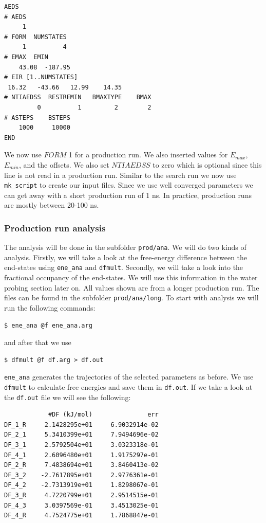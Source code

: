 \begin{lstlisting}
AEDS
# AEDS
     1
# FORM  NUMSTATES
     1          4
# EMAX  EMIN
    43.08  -187.95
# EIR [1..NUMSTATES]
 16.32   -43.66   12.99    14.35 
# NTIAEDSS  RESTREMIN   BMAXTYPE    BMAX   
         0          1         2        2      
# ASTEPS    BSTEPS
    1000     10000 
END
\end{lstlisting}

We now use $FORM$ 1 for a production run. We also inserted values for $E_{max}$, $E_{min}$, and the offsets. We also set $NTIAEDSS$ to zero which is optional since this line is not read in a production run. Similar to the search run we now use \texttt{mk\_script} to create our input files.
Since we use well converged parameters we can get away with a short production run of 1 ns. In practice, production runs are mostly between 20-100 ns.

\subsubsection{Production run analysis}
The analysis will be done in the subfolder \texttt{prod/ana}. We will do two kinds of analysis. Firstly, we will take a look at the free-energy difference between the end-states using \texttt{ene\_ana} and \texttt{dfmult}. Secondly, we will take a look into the fractional occupancy of the end-states. We will use this information in the water probing section later on. All values shown are from a longer production run. The files can be found in the subfolder \texttt{prod/ana/long}. To start with analysis we will run the following commands:

\begin{lstlisting}
$ ene_ana @f ene_ana.arg
\end{lstlisting}

and after that we use

\begin{lstlisting}
$ dfmult @f df.arg > df.out
\end{lstlisting}

\texttt{ene\_ana} generates the trajectories of the selected parameters as before. We use \texttt{dfmult} to calculate free energies and save them in \texttt{df.out}. If we take a look at the \texttt{df.out} file we will see the following:

\begin{lstlisting}
            #DF (kJ/mol)               err
DF_1_R     2.1428295e+01     6.9032914e-02
DF_2_1     5.3410399e+01     7.9494696e-02
DF_3_1     2.5792504e+01     3.0323318e-01
DF_4_1     2.6096480e+01     1.9175297e-01
DF_2_R     7.4838694e+01     3.8460413e-02
DF_3_2    -2.7617895e+01     2.9776361e-01
DF_4_2    -2.7313919e+01     1.8298067e-01
DF_3_R     4.7220799e+01     2.9514515e-01
DF_4_3     3.0397569e-01     3.4513025e-01
DF_4_R     4.7524775e+01     1.7868847e-01
\end{lstlisting}

